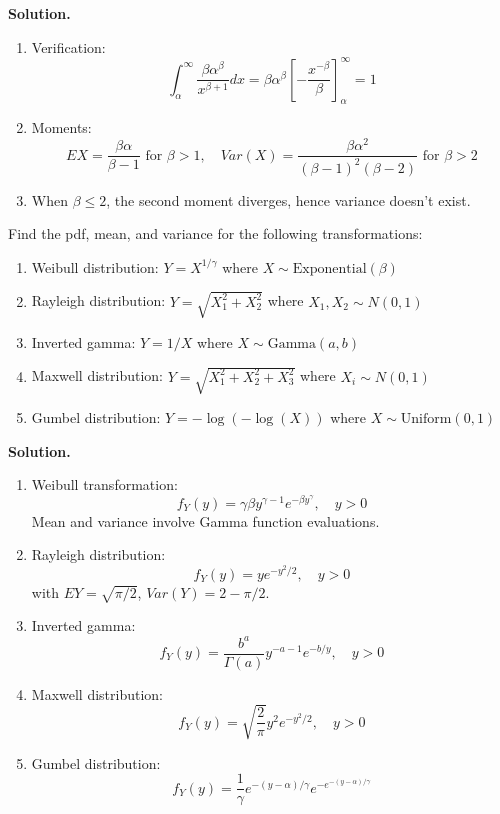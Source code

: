 \noindent\textbf{Solution.}
\begin{enumerate}[label=(\alph*)]
\item Verification:
\[
\int_\alpha^\infty \frac{\beta\alpha^\beta}{x^{\beta+1}}dx = \beta\alpha^\beta\left[-\frac{x^{-\beta}}{\beta}\right]_\alpha^\infty = 1
\]

\item Moments:
\[
EX = \frac{\beta\alpha}{\beta-1} \text{ for } \beta>1, \quad Var(X) = \frac{\beta\alpha^2}{(\beta-1)^2(\beta-2)} \text{ for } \beta>2
\]

\item When $\beta \leq 2$, the second moment diverges, hence variance doesn't exist.
\end{enumerate}

\begin{problembox}
Find the pdf, mean, and variance for the following transformations:
\begin{enumerate}[label=(\alph*)]
\item Weibull distribution: $Y = X^{1/\gamma}$ where $X \sim \text{Exponential}(\beta)$
\item Rayleigh distribution: $Y = \sqrt{X_1^2 + X_2^2}$ where $X_1, X_2 \sim N(0,1)$
\item Inverted gamma: $Y = 1/X$ where $X \sim \text{Gamma}(a,b)$
\item Maxwell distribution: $Y = \sqrt{X_1^2 + X_2^2 + X_3^2}$ where $X_i \sim N(0,1)$
\item Gumbel distribution: $Y = -\log(-\log(X))$ where $X \sim \text{Uniform}(0,1)$
\end{enumerate}
\end{problembox}

\noindent\textbf{Solution.}
\begin{enumerate}[label=(\alph*)]
\item Weibull transformation:
\[
f_Y(y) = \gamma\beta y^{\gamma-1}e^{-\beta y^\gamma}, \quad y>0
\]
Mean and variance involve Gamma function evaluations.

\item Rayleigh distribution:
\[
f_Y(y) = ye^{-y^2/2}, \quad y>0
\]
with $EY = \sqrt{\pi/2}$, $Var(Y) = 2 - \pi/2$.

\item Inverted gamma:
\[
f_Y(y) = \frac{b^a}{\Gamma(a)}y^{-a-1}e^{-b/y}, \quad y>0
\]

\item Maxwell distribution:
\[
f_Y(y) = \sqrt{\frac{2}{\pi}}y^2e^{-y^2/2}, \quad y>0
\]

\item Gumbel distribution:
\[
f_Y(y) = \frac{1}{\gamma}e^{-(y-\alpha)/\gamma}e^{-e^{-(y-\alpha)/\gamma}}
\]
\end{enumerate}

